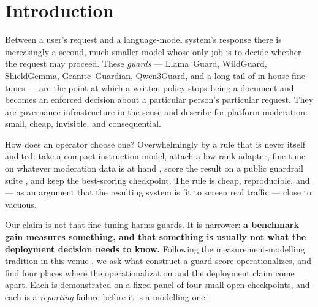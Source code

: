 \documentclass[manuscript,screen,review,anonymous]{acmart}
\begin{document}

\maketitle

\section{Introduction}
\label{sec:intro}

Between a user's request and a language-model system's response there is increasingly a second, much
smaller model whose only job is to decide whether the request may proceed. These \emph{guards} ---
Llama~Guard, WildGuard, ShieldGemma, Granite~Guardian, Qwen3Guard, and a long tail of in-house fine-tunes
\citep{inan2023llamaguard,han2024wildguard,zeng2024shieldgemma,padhi2024graniteguardian,qwen3guard2025}
--- are the point at which a written policy stops being a document and becomes an enforced decision about
a particular person's particular request. They are governance infrastructure in the sense
\citet{gorwa2020algorithmic} and \citet{gillespie2018custodians} describe for platform moderation: small,
cheap, invisible, and consequential.

How does an operator choose one? Overwhelmingly by a rule that is never itself audited: take a compact
instruction model, attach a low-rank adapter, fine-tune on whatever moderation data is at hand
\citep{elesedy2024loraguard,hu2021lora}, score the result on a public guardrail suite
\citep{bassani2024guardbench}, and keep the best-scoring checkpoint. The rule is cheap, reproducible,
and --- as an argument that the resulting system is fit to screen real traffic --- close to vacuous.

Our claim is not that fine-tuning harms guards. It is narrower: \textbf{a benchmark gain measures
something, and that something is usually not what the deployment decision needs to know.} Following the
measurement-modelling tradition in this venue
\citep{jacobs2021measurement,raji2021everything,blodgett2021salmon}, we ask what construct a guard score
operationalizes, and find four places where the operationalization and the deployment claim come apart.
Each is demonstrated on a fixed panel of four small open checkpoints, and each is a \emph{reporting}
failure before it is a modelling one:
\end{document}
